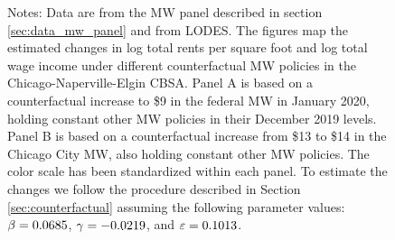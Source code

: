 \begin{figure}[h!]
    \begin{minipage}{.95\textwidth} \footnotesize
        \vspace{2.5mm}
        Notes: 
        Data are from the MW panel described in section \ref{sec:data_mw_panel} 
        and from LODES.
        The figures map the estimated changes in log total rents per square foot
        and log total wage income under different counterfactual MW policies 
        in the Chicago-Naperville-Elgin CBSA.
        Panel A is based on a counterfactual increase to \$9 in the 
        federal MW in January 2020, holding constant other MW policies in their 
        December 2019 levels.
        Panel B is based on a counterfactual increase from \$13 to \$14 in the 
        Chicago City MW, also holding constant other MW policies.
        The color scale has been standardized within each panel.
        To estimate the changes we follow the procedure described in Section 
        \ref{sec:counterfactual} assuming the following parameter values: 
        $\beta = 0.0685$, $\gamma = -0.0219$, and $\varepsilon = 0.1013$.
    \end{minipage}
\end{figure}

